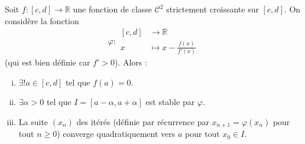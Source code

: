 



	
	
	\begin{theorem}
		Soit $f : [c, d] \rightarrow \mathbb{R}$ une fonction de classe $\mathcal{C}^2$ strictement croissante sur $[c, d]$. On considère la fonction
		\[ \varphi :
		\begin{array}{cl}
			[c, d] &\rightarrow \mathbb{R} \\
			x &\mapsto x - \frac{f(x)}{f'(x)}
		\end{array}
		\]
		(qui est bien définie car $f' > 0$). Alors :
		\begin{enumerate}[(i)]
			\item $\exists! a \in [c, d]$ tel que $f(a) = 0$.
			\item $\exists \alpha > 0$ tel que $I = [a - \alpha, a + \alpha]$ est stable par $\varphi$.
			\item La suite $(x_n)$ des itérés (définie par récurrence par $x_{n+1} = \varphi(x_n)$ pour tout $n \geq 0$) converge quadratiquement vers $a$ pour tout $x_0 \in I$.
		\end{enumerate}
	\end{theorem}

